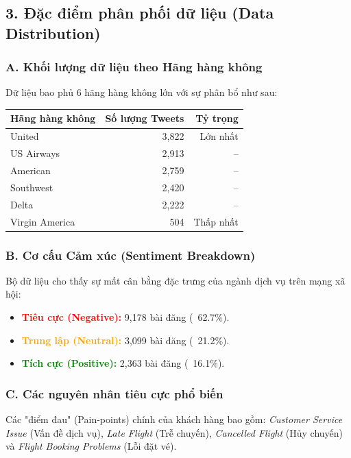 \documentclass{article}
\begin{document}
\subsection{3. Đặc điểm phân phối dữ liệu (Data Distribution)}

\subsubsection*{A. Khối lượng dữ liệu theo Hãng hàng không}
Dữ liệu bao phủ 6 hãng hàng không lớn với sự phân bổ như sau:
\begin{table}[h!]
\centering
\begin{tabular}{lrr}
\toprule
\textbf{Hãng hàng không} & \textbf{Số lượng Tweets} & \textbf{Tỷ trọng} \\ \midrule
United           & 3,822 & Lớn nhất \\
US Airways       & 2,913 & -- \\
American         & 2,759 & -- \\
Southwest        & 2,420 & -- \\
Delta            & 2,222 & -- \\
Virgin America   & 504   & Thấp nhất \\ \bottomrule
\end{tabular}
\end{table}

\subsubsection*{B. Cơ cấu Cảm xúc (Sentiment Breakdown)}
Bộ dữ liệu cho thấy sự mất cân bằng đặc trưng của ngành dịch vụ trên mạng xã hội:
\begin{itemize}
    \item \textcolor{red}{\textbf{Tiêu cực (Negative):}} 9,178 bài đăng (~62.7\%).
    \item \textcolor{orange}{\textbf{Trung lập (Neutral):}} 3,099 bài đăng (~21.2\%).
    \item \textcolor{green}{\textbf{Tích cực (Positive):}} 2,363 bài đăng (~16.1\%).
\end{itemize}

\subsubsection*{C. Các nguyên nhân tiêu cực phổ biến}
Các "điểm đau" (Pain-points) chính của khách hàng bao gồm: \textit{Customer Service Issue} (Vấn đề dịch vụ), \textit{Late Flight} (Trễ chuyến), \textit{Cancelled Flight} (Hủy chuyến) và \textit{Flight Booking Problems} (Lỗi đặt vé).
\end{document}
